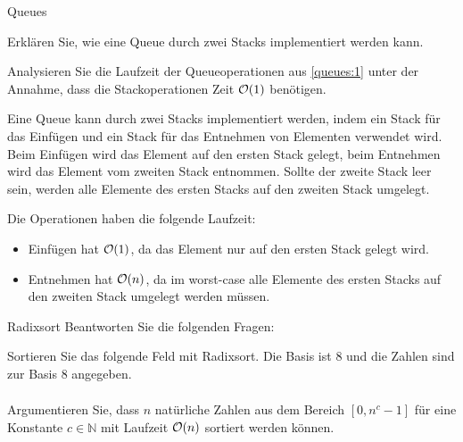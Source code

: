 \documentclass{exercisesheet}
\begin{document}
\begin{exercises}{Queues}
\item\label{queues:1} Erklären Sie, wie eine Queue durch zwei Stacks implementiert werden kann.
\item Analysieren Sie die Laufzeit der Queueoperationen aus \ref{queues:1} unter der Annahme, dass die Stackoperationen Zeit $\mathcal{O}(1)$ benötigen.
\end{exercises}

\begin{solutions}
  \item Eine Queue kann durch zwei Stacks implementiert werden, indem ein Stack für das Einfügen und ein Stack für das Entnehmen von Elementen verwendet wird. Beim Einfügen wird das Element auf den ersten Stack gelegt, beim Entnehmen wird das Element vom zweiten Stack entnommen. Sollte der zweite Stack leer sein, werden alle Elemente des ersten Stacks auf den zweiten Stack umgelegt.
  \item Die Operationen haben die folgende Laufzeit:
  \begin{itemize}
    \item Einfügen hat $\mathcal{O}(1)$, da das Element nur auf den ersten Stack gelegt wird.
    \item Entnehmen hat $\mathcal{O}(n)$, da im worst-case alle Elemente des ersten Stacks auf den zweiten Stack umgelegt werden müssen.
  \end{itemize}
\end{solutions}



\begin{eexercises}{Radixsort}{
    Beantworten Sie die folgenden Fragen:
  }
  \item Sortieren Sie das folgende Feld mit Radixsort. Die Basis ist 8 und die Zahlen sind zur Basis 8 angegeben.
  \begin{align*}
    [142, 204, 154, 7, 104, 162, 521, 17, 262, 504, 370, 252]
  \end{align*}
  \item Argumentieren Sie, dass $n$ natürliche Zahlen aus dem Bereich $[0, n^c - 1]$ für eine Konstante $c \in \mathbb{N}$ mit Laufzeit $\mathcal{O}(n)$ sortiert werden können.
\end{eexercises}
\end{document}
